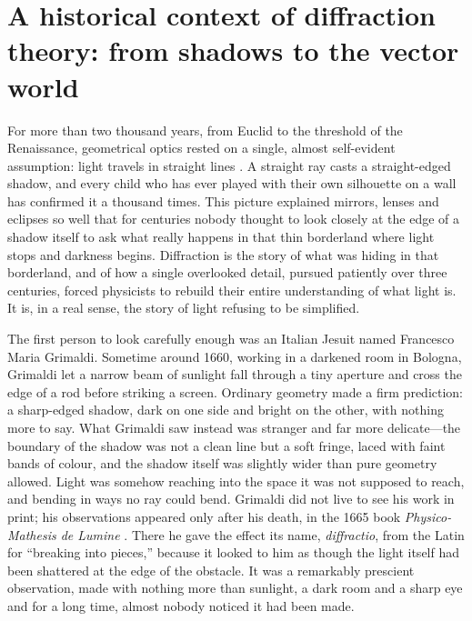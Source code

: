 \section{A historical context of diffraction theory: from shadows to the vector world}

	For more than two thousand years, from Euclid to the threshold of the Renaissance, geometrical optics rested on a single, almost self-evident assumption: light travels in straight lines \cite{herzberger1966optics}. A straight ray casts a straight-edged shadow, and every child who has ever played with their own silhouette on a wall has confirmed it a thousand times. This picture explained mirrors, lenses and eclipses so well that for centuries nobody thought to look closely at the edge of a shadow itself to ask what really happens in that thin borderland where light stops and darkness begins. Diffraction is the story of what was hiding in that borderland, and of how a single overlooked detail, pursued patiently over three centuries, forced physicists to rebuild their entire understanding of what light is. It is, in a real sense, the story of light refusing to be simplified.

	The first person to look carefully enough was an Italian Jesuit named Francesco Maria Grimaldi. Sometime around 1660, working in a darkened room in Bologna, Grimaldi let a narrow beam of sunlight fall through a tiny aperture and cross the edge of a rod before striking a screen. Ordinary geometry made a firm prediction: a sharp-edged shadow, dark on one side and bright on the other, with nothing more to say. What Grimaldi saw instead was stranger and far more delicate---the boundary of the shadow was not a clean line but a soft fringe, laced with faint bands of colour, and the shadow itself was slightly wider than pure geometry allowed. Light was somehow reaching into the space it was not supposed to reach, and bending in ways no ray could bend. Grimaldi did not live to see his work in print; his observations appeared only after his death, in the 1665 book \textit{Physico-Mathesis de Lumine} \cite{grimaldi1665physico}. There he gave the effect its name, \textit{diffractio}, from the Latin for ``breaking into pieces,'' because it looked to him as though the light itself had been shattered at the edge of the obstacle. It was a remarkably prescient observation, made with nothing more than sunlight, a dark room and a sharp eye and for a long time, almost nobody noticed it had been made.

